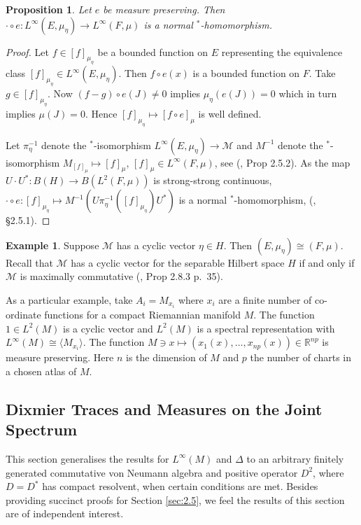 \documentclass[final,1p]{elsarticle}
\numberwithin{equation}{section}
\theoremstyle{plain}
\newtheorem{prop}[thm]{Proposition}
\theoremstyle{definition}
\newtheorem{ex}[thm]{Example}
\newcounter{prop2count}
\begin{document}
\begin{prop}
Let $e$ be measure preserving.  Then $\cdot \circ e : L^\infty(E,\mu_\eta) \to L^\infty(F,\mu)$ is a normal $^*$-homomorphism. 
\end{prop}
\begin{proof}
Let $f \in [f]_{\mu_\eta}$ be a bounded function on $E$ representing
the equivalence class $[f]_{\mu_\eta} \in L^\infty(E,\mu_\eta)$.
Then $f \circ e(x)$ is a bounded function on $F$.
Take $g \in [f]_{\mu_\eta}$.
Now $(f - g)\circ e(J) \not= 0$ implies $\mu_\eta(e(J)) = 0$
which in turn implies $\mu(J) = 0$.
Hence $[f]_{\mu_\eta} \mapsto [f \circ e]_\mu$ is well defined.

Let $\pi_\eta^{-1}$ denote the $^*$-isomorphism
$L^\infty(E,\mu_\eta) \to \mathcal{M}$ and $M^{-1}$ denote the $^*$-isomorphism
$M_{[f]_\mu} \mapsto [f]_\mu$, $[f]_\mu \in L^\infty(F,\mu)$, see (\cite{Ped}, Prop 2.5.2).
As the map $U \cdot U^* : B(H) \to B(L^2(F,\mu))$ is strong-strong continuous,
$\cdot \circ e : [f]_{\mu_\eta} \mapsto M^{-1}(U\pi_\eta^{-1}([f]_{\mu_\eta})U^*)$
is a normal $^*$-homomorphism, (\cite{Ped}, \S 2.5.1).
\end{proof}

\begin{ex}
Suppose $\mathcal{M}$ has a cyclic vector $\eta \in H$.  Then $(E,\mu_\eta) \cong (F,\mu)$.
Recall that $\mathcal{M}$ has a cyclic vector for the separable Hilbert space $H$
if and only if $\mathcal{M}$ is maximally commutative (\cite{Ped}, Prop 2.8.3 p.~35).

As a particular example, take $A_i = M_{x_i}$ where $x_i$ are a finite number of co-ordinate functions for a compact Riemannian manifold $M$.  The function
$1 \in L^2(M)$ is a cyclic vector and $L^2(M)$ is a spectral representation
with $L^\infty(M) \cong \langle M_{x_i} \rangle$.  The function
$M \ni x \mapsto (x_1(x), \ldots, x_{np}(x)) \in {\ensuremath{\mathbb{R}}}^{np}$ is measure preserving.  Here $n$ is the dimension of $M$ and $p$ the number of charts in a chosen atlas of $M$.
\end{ex}

\subsection{Dixmier Traces and Measures on the Joint Spectrum} \label{sec:2.4}

\medskip This section generalises the results for $L^\infty(M)$ and $\Delta$ to an arbitrary finitely generated commutative von Neumann algebra and positive operator $D^2$, where $D=D^*$ has compact resolvent, when certain conditions are met.  Besides providing succinct proofs for Section \ref{sec:2.5}, we feel the results of this section are of independent interest.
\end{document}
